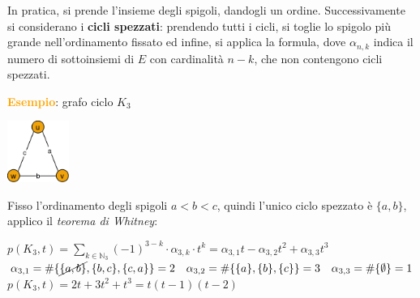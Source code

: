 \begin{flushleft}
    In pratica, si prende l'insieme degli spigoli, dandogli un ordine. Successivamente si considerano i \textbf{cicli spezzati}: prendendo tutti i cicli, si toglie lo spigolo più grande nell'ordinamento fissato ed infine, si applica la formula, dove $\alpha_{n,k}$ indica il numero di sottoinsiemi di $E$ con cardinalità $n-k$, che non contengono cicli spezzati.
    \begin{boxA}
        \textcolor{orange}{\textbf{Esempio}}: grafo ciclo $K_3$
        
        {\centering
            \includegraphics[width=0.15\textwidth]{img/k3}
        \par}
        Fisso l'ordinamento degli spigoli $a < b < c$, quindi l'unico ciclo spezzato è $\{a, b\}$, applico il \textit{teorema di Whitney}:

        {\centering
            $p(K_3, t) = \underset{k \in \mathbb{N}_3}{\sum} (-1)^{3-k} \cdot \alpha_{3,k} \cdot t^k = \alpha_{3,1}t - \alpha_{3,2}t^2 + \alpha_{3,3}t^3$ \\
            
            $\alpha_{3,1} = \# \{ \cancel{\{a, b\}}, \{b, c\}, \{c, a\} \} = 2 \quad \alpha_{3,2} = \# \{ \{a\}, \{b\}, \{c\} \} = 3 \quad \alpha_{3,3} = \# \{\emptyset\} = 1$ \\

            $p(K_3, t) = 2t + 3t^2 + t^3 = t(t-1)(t-2)$
        \par}
    \end{boxA}
\end{flushleft}

